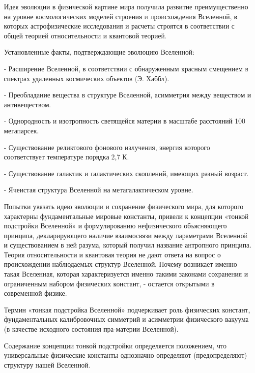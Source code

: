 \documentclass[exam_answers.tex]{subfiles}
\begin{document}
\renewcommand{\baselinestretch}{\blch}

Идея эволюции в физической картине мира получила развитие
преимущественно на уровне космологических моделей строения и
происхождения Вселенной, в которых астрофизические
исследования и расчеты строятся в соответствии с общей теорией
относительности и квантовой теорией.

Установленные факты, подтверждающие эволюцию Вселенной:

- Расширение Вселенной, в соответствии с обнаруженным красным
смещением в спектрах удаленных космических объектов (Э. Хаббл).

- Преобладание вещества в структуре Вселенной, асимметрия между
веществом и антивеществом.

- Однородность и изотропность светящейся материи в масштабе
расстояний 100 мегапарсек.

- Существование реликтового фонового излучения, энергия которого
соответствует температуре порядка 2,7 К.

- Существование галактик и галактических скоплений, имеющих
разный возраст.

- Ячеистая структура Вселенной на метагалактическом уровне.

Попытки увязать идею эволюции и сохранение физического мира,
для которого характерны фундаментальные мировые константы,
привели к концепции «тонкой подстройки Вселенной» и
формулированию нефизического объясняющего принципа,
декларирующего наличие взаимосвязи между параметрами
Вселенной и существованием в ней разума, который получил
название антропного принципа.
\\

Теория относительности и квантовая теория не дают ответа на вопрос о
происхождении наблюдаемых структур Вселенной. Почему возникает
именно такая Вселенная, которая характеризуется именно такими
законами сохранения и ограниченным набором физических констант, -
остается открытыми в современной физике.

Термин «тонкая подстройка Вселенной» подчеркивает роль физических
констант, фундаментальных калибровочных симметрий и асимметрии
физического вакуума (в качестве исходного состояния пра-материи
Вселенной).

Содержание концепции тонкой подстройки определяется положением,
что универсальные физические константы однозначно определяют
(предопределяют) структуру нашей Вселенной.
\end{document}
